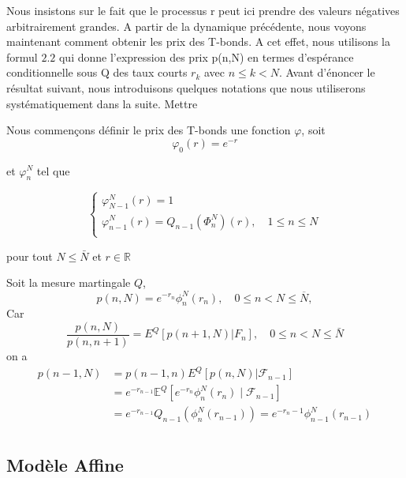 Nous insistons sur le fait que le processus r peut ici prendre des valeurs négatives arbitrairement grandes. A partir de la dynamique précédente, nous voyons maintenant comment obtenir les prix des T-bonds. A cet effet, nous utilisons la formul \(2.2\) qui donne l'expression des prix p(n,N) en termes d'espérance conditionnelle sous Q des taux courts $r_k$ avec $n \le k < N$. Avant d'énoncer le résultat suivant, nous introduisons quelques notations que nous utiliserons systématiquement dans la suite. Mettre


Nous commençons définir le prix des T-bonds une fonction $\varphi$, soit 
\begin{equation}
    \varphi_0 (r) = e^{-r}
\end{equation}

et $\varphi_{n}^{N}$ tel que 

\begin{equation}
\begin{cases}
    \varphi^{N}_{N-1}(r) = 1\\
\varphi^{N}_{n-1}(r) = Q_{n-1}(\Phi^{N}_n) (r), \quad 1 \leq n \leq N\\
\end{cases}
\end{equation}

pour tout $N \le \bar{N}$ et $r \in \mathbb{R}$

Soit la mesure martingale $Q$,
\begin{equation}
p(n, N) = e^{-r_n} \phi_n^N (r_n), \quad 0 \leq n < N \leq \overline{N},
\end{equation}
Car 
\begin{equation*}
    \frac{p(n,N)}{p(n,n+1)} = E^Q[p(n+1,N)|F_n], \quad 0 \leq n < N \leq \bar{N}
\end{equation*}
on a 
\begin{align*}
p(n-1,N) 
    &= p(n-1,n) E^Q[p(n,N)|\mathcal{F}_{n-1}]\\
    &= e^{-r_{n - 1}} \mathbb{E}^Q \left[ e^{-r_n} \phi_n^N (r_n) \mid \mathcal{F}_{n-1} \right] \\
    &= e^{-r_{n - 1}} Q_{n-1} (\phi_n^N (r_{n-1})) = e^{-r_n - 1} \phi_{n-1}^N (r_{n-1})\\
\end{align*}


\subsection{Modèle Affine}

